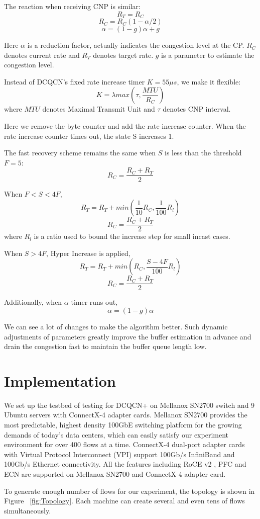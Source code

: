 \documentclass[12pt,a4paper]{article}
\begin{document}
The reaction when receiving CNP is similar:
\[R_T=R_C\]
\[R_C=R_C(1-\alpha /2)\]
\[\alpha = (1-g)\alpha + g\]

Here $\alpha$ is a reduction factor, actually indicates the congestion level at the CP.
$R_C$ denotes current rate and $R_T$ denotes target rate.
$g$ is a parameter to estimate the congestion level.

Instead of DCQCN's fixed rate increase timer $K=55\mu s$, we make it flexible:
\[K=\lambda max(\tau, \frac{MTU}{R_C})\]
where $MTU$ denotes Maximal Transmit Unit and $\tau$ denotes CNP interval.

Here we remove the byte counter and add the rate increase counter.
When the rate increase counter times out, the state S increases 1.

The fast recovery scheme remains the same when $S$ is less than the threshold $F = 5$:
\[R_C=\frac{R_C+R_T}{2}\]

When $F<S<4F$,
\[R_T=R_T+ min(\frac{1}{10}R_C,\frac{1}{100}R_l)\]
\[R_C=\frac{R_C+R_T}{2}\]
where $R_l$ is a ratio used to bound the increase step for small incast cases.

When $S>4F$, Hyper Increase is applied,
\[R_T=R_T+min(R_C, \frac{S-4F}{100}R_l)\]
\[R_C=\frac{R_C+R_T}{2}\]

Additionally, when $\alpha$ timer runs out,
\[\alpha=(1-g)\alpha\]

We can see a lot of changes to make the algorithm better.
Such dynamic adjustments of parameters greatly improve the buffer estimation in advance and drain the congestion fast
to maintain the buffer queue length low.

\section{Implementation}

We set up the testbed of testing for DCQCN+ on Mellanox SN2700 switch and 9 Ubuntu servers with ConnectX-4 adapter cards.
Mellanox SN2700 provides the most predictable,
highest density 100GbE switching platform for the growing demands of today's data centers,
which can easily satisfy our experiment environment for over 400 flows at a time.
ConnectX-4 dual-port adapter cards with Virtual Protocol Interconnect (VPI) support 100Gb/s InfiniBand and 100Gb/s Ethernet connectivity.
All the features including RoCE v2 \cite{RoCEv2}, PFC and ECN are supported on Mellanox SN2700 and ConnectX-4 adapter card.

To generate enough number of flows for our experiment, the topology is shown in Figure ~\ref{fig:Topology}.
Each machine can create several and even tens of flows simultaneously.
\end{document}

